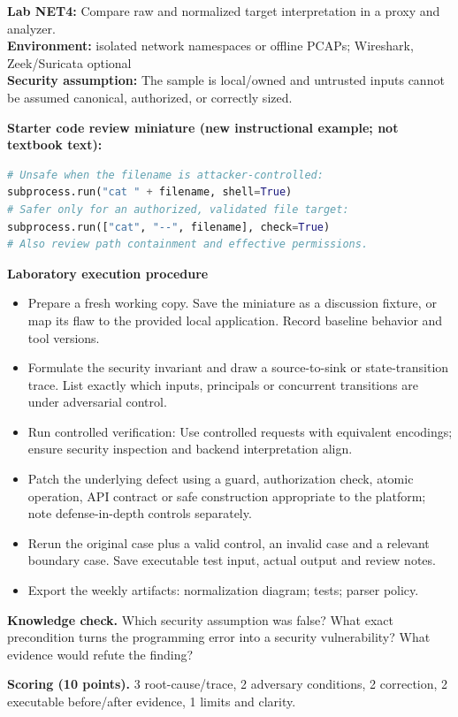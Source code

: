 \documentclass[10pt,letterpaper]{article}
\begin{document}
\begin{insight}\textbf{Lab NET4:} Compare raw and normalized target interpretation in a proxy and analyzer.\\\textbf{Environment:} isolated network namespaces or offline PCAPs; Wireshark, Zeek/Suricata optional\\\textbf{Security assumption:} The sample is local/owned and untrusted inputs cannot be assumed canonical, authorized, or correctly sized.\end{insight}
\textbf{Starter code review miniature (new instructional example; not textbook text):}
\begin{lstlisting}[language=Python]
# Unsafe when the filename is attacker-controlled:
subprocess.run("cat " + filename, shell=True)
# Safer only for an authorized, validated file target:
subprocess.run(["cat", "--", filename], check=True)
# Also review path containment and effective permissions.
\end{lstlisting}
\textbf{Laboratory execution procedure}
\begin{itemize}[leftmargin=*,itemsep=2pt]
\item Prepare a fresh working copy. Save the miniature as a discussion fixture, or map its flaw to the provided local application. Record baseline behavior and tool versions.
\item Formulate the security invariant and draw a source-to-sink or state-transition trace. List exactly which inputs, principals or concurrent transitions are under adversarial control.
\item Run controlled verification: Use controlled requests with equivalent encodings; ensure security inspection and backend interpretation align.
\item Patch the underlying defect using a guard, authorization check, atomic operation, API contract or safe construction appropriate to the platform; note defense-in-depth controls separately.
\item Rerun the original case plus a valid control, an invalid case and a relevant boundary case. Save executable test input, actual output and review notes.
\item Export the weekly artifacts: normalization diagram; tests; parser policy.
\end{itemize}
\textbf{Knowledge check.} Which security assumption was false? What exact precondition turns the programming error into a security vulnerability? What evidence would refute the finding?

\textbf{Scoring (10 points).} 3 root-cause/trace, 2 adversary conditions, 2 correction, 2 executable before/after evidence, 1 limits and clarity.
\end{document}
